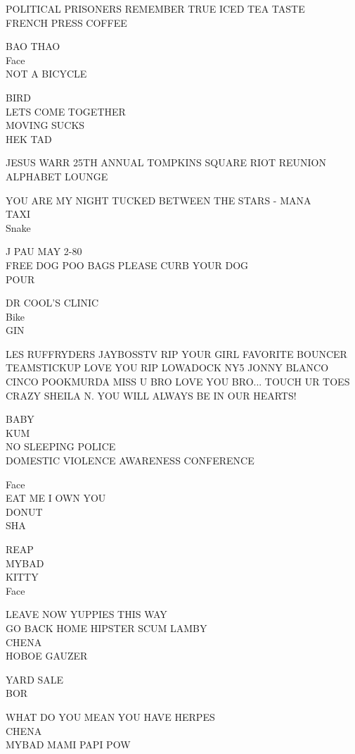 \documentclass[10pt,letterpaper]{article}
\begin{document}
POLITICAL PRISONERS REMEMBER TRUE ICED TEA TASTE\\
FRENCH PRESS COFFEE

BAO THAO\\
Face\\
NOT A BICYCLE

BIRD\\
LETS COME TOGETHER\\
MOVING SUCKS\\
HEK TAD

JESUS WARR 25TH ANNUAL TOMPKINS SQUARE RIOT REUNION\\
ALPHABET LOUNGE

YOU ARE MY NIGHT TUCKED BETWEEN THE STARS {-} MANA\\
TAXI\\
Snake

J PAU MAY 2{-}80\\
FREE DOG POO BAGS PLEASE CURB YOUR DOG\\
POUR

DR COOL'S CLINIC\\
Bike\\
GIN

LES RUFFRYDERS JAYBOSSTV RIP YOUR GIRL FAVORITE BOUNCER TEAMSTICKUP LOVE YOU RIP LOWADOCK NY5 JONNY BLANCO CINCO POOKMURDA MISS U BRO LOVE YOU BRO... TOUCH UR TOES\\
CRAZY SHEILA N. YOU WILL ALWAYS BE IN OUR HEARTS!

BABY\\
KUM\\
NO SLEEPING POLICE\\
DOMESTIC VIOLENCE AWARENESS CONFERENCE

Face\\
EAT ME I OWN YOU\\
DONUT\\
SHA

REAP\\
MYBAD\\
KITTY\\
Face

LEAVE NOW YUPPIES THIS WAY\\
GO BACK HOME HIPSTER SCUM LAMBY\\
CHENA\\
HOBOE GAUZER

YARD SALE\\
BOR

WHAT DO YOU MEAN YOU HAVE HERPES\\
CHENA\\
MYBAD MAMI PAPI POW
\end{document}
